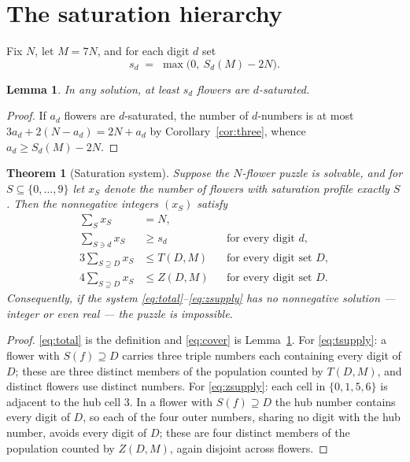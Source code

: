 \documentclass[11pt]{article}
\newtheorem{theorem}{Theorem}
\newtheorem{lemma}{Lemma}
\theoremstyle{definition}
\theoremstyle{remark}
\newcommand{\Sd}[2]{S_{#1}(#2)}
\begin{document}
\section{The saturation hierarchy}\label{sec:saturation}

Fix $N$, let $M=7N$, and for each digit $d$ set
\[
s_d \;=\; \max\bigl(0,\ \Sd{d}{M}-2N\bigr).
\]

\begin{lemma}\label{lem:sd}
In any solution, at least $s_d$ flowers are $d$-saturated.
\end{lemma}

\begin{proof}
If $a_d$ flowers are $d$-saturated, the number of $d$-numbers is at most $3a_d+2(N-a_d)=2N+a_d$ by Corollary~\ref{cor:three}, whence $a_d \ge \Sd{d}{M}-2N$.
\end{proof}

\begin{theorem}[Saturation system]\label{thm:system}
Suppose the $N$-flower puzzle is solvable, and for $S\subseteq\{0,\dots,9\}$ let $x_S$ denote the number of flowers with saturation profile exactly $S$. Then the nonnegative integers $(x_S)$ satisfy
\begin{align}
\textstyle\sum_S x_S &= N, \label{eq:total}\\
\textstyle\sum_{S\ni d} x_S &\ge s_d && \text{for every digit } d, \label{eq:cover}\\
3\textstyle\sum_{S\supseteq D} x_S &\le T(D,M) && \text{for every digit set } D, \label{eq:tsupply}\\
4\textstyle\sum_{S\supseteq D} x_S &\le Z(D,M) && \text{for every digit set } D. \label{eq:zsupply}
\end{align}
Consequently, if the system \eqref{eq:total}--\eqref{eq:zsupply} has no nonnegative solution --- integer or even real --- the puzzle is impossible.
\end{theorem}

\begin{proof}
\eqref{eq:total} is the definition and \eqref{eq:cover} is Lemma~\ref{lem:sd}. For \eqref{eq:tsupply}: a flower with $S(f)\supseteq D$ carries three triple numbers each containing every digit of $D$; these are three distinct members of the population counted by $T(D,M)$, and distinct flowers use distinct numbers. For \eqref{eq:zsupply}: each cell in $\{0,1,5,6\}$ is adjacent to the hub cell $3$. In a flower with $S(f)\supseteq D$ the hub number contains every digit of $D$, so each of the four outer numbers, sharing no digit with the hub number, avoids every digit of $D$; these are four distinct members of the population counted by $Z(D,M)$, again disjoint across flowers.
\end{proof}
\end{document}
